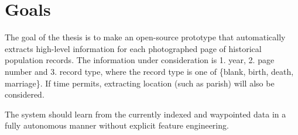 \section{Goals}

The goal of the thesis is to make an open-source prototype that automatically extracts high-level information for each photographed page of historical population records. The information under consideration is 1. year, 2. page number and 3. record type, where the record type is one of \{blank, birth, death, marriage\}.
If time permits, extracting location (such as parish) will also be considered.

The system should learn from the currently indexed and waypointed data in a fully autonomous manner without explicit feature engineering.


